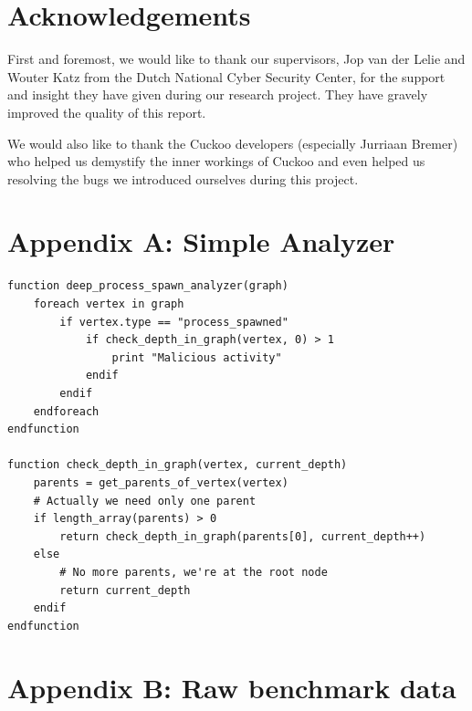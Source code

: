 \documentclass{scrartcl}
\begin{document}
\clearpage

\section*{Acknowledgements}

First and foremost, we would like to thank our supervisors, Jop van der Lelie and Wouter Katz from the Dutch National Cyber Security Center, for the support and insight they have given during our research project. They have gravely improved the quality of this report.

We would also like to thank the Cuckoo developers (especially Jurriaan Bremer) who helped us demystify the inner workings of Cuckoo and even helped us resolving the bugs we introduced ourselves during this project.

\clearpage





\clearpage

\section*{Appendix A: Simple Analyzer}


\begin{lstlisting}
function deep_process_spawn_analyzer(graph)
    foreach vertex in graph
        if vertex.type == "process_spawned"
            if check_depth_in_graph(vertex, 0) > 1
                print "Malicious activity"
            endif
        endif
    endforeach
endfunction

function check_depth_in_graph(vertex, current_depth)
    parents = get_parents_of_vertex(vertex)
    # Actually we need only one parent
    if length_array(parents) > 0
        return check_depth_in_graph(parents[0], current_depth++)
    else
        # No more parents, we're at the root node
        return current_depth
    endif
endfunction
\end{lstlisting}

\clearpage

\section*{Appendix B: Raw benchmark data}
\end{document}
